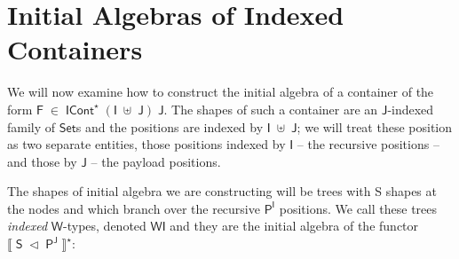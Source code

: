 \documentclass[a4paper]{article}
\newcommand{\Conid}[1]{\mathit{#1}}
\newcommand{\Varid}[1]{\mathit{#1}}
\renewcommand\Varid[1]{\mathord{\textsf{#1}}}
\let\Conid\Varid
\begin{document}


\section{Initial Algebras of Indexed Containers}
\label{sec:initalg}

We will now examine how to construct the initial algebra of a container of
the form \ensuremath{\Conid{F}\;\in\;\Conid{ICont}^{\star}\;(\Conid{I}\;\uplus\;\Conid{J})\;\Conid{J}}. The shapes of such a container are an
\ensuremath{\Conid{J}}-indexed family of \ensuremath{\Conid{Set}}s and the positions are indexed by \ensuremath{\Conid{I}\;\uplus\;\Conid{J}}; we
will treat these position as two separate entities, those positions indexed
by \ensuremath{\Conid{I}} -- the recursive positions -- and those by \ensuremath{\Conid{J}} -- the payload
positions.

The shapes of initial algebra we are constructing will be trees with S shapes
at the nodes and which branch over the recursive \ensuremath{\Conid{P}^{\Conid{I}}} positions. We call
these trees \emph{indexed} \ensuremath{\Conid{W}}-types, denoted \ensuremath{\Conid{WI}} and they are the initial
algebra of the functor \ensuremath{\Varid{⟦}\;\Conid{S}\;\lhd\;\Conid{P}^{\Conid{J}}\;\Varid{⟧}^{\star}}:
\end{document}
